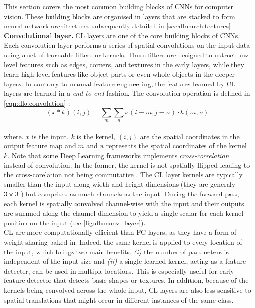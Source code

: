 This section covers the most common building blocks of \acp{CNN} for computer
vision. These building blocks are organised in layers that are stacked to form
neural network architectures subsequently detailed in
\cref{sec:dlo:architectures}.\\

\noindent\textbf{Convolutional layer.} \ac{CL} layers are one of the core
building blocks of \acp{CNN}. Each convolution layer performs a series of
spatial convolutions on the input data using a set of learnable filters or
kernels. These filters are designed to extract low-level features such as edges,
corners, and textures in the early layers, while they learn high-level features
like object parts or even whole objects in the deeper layers. In contrary to
manual feature engineering, the features learned by \ac{CL} layers are
learned in a \emph{end-to-end} fashion. The convolution operation is defined in
\cref{eqn:dlo:convolution} :\\

\begin{equation}
  \label{eqn:dlo:convolution}
  (x * k)(i,j) = \sum_{m} \sum_{n} x(i -m, j -n) \cdot k(m, n)
\end{equation}\\

\noindent where, $x$ is the input, $k$ is the kernel, $(i,j)$ are the spatial
coordinates in the output feature map and $m$ and $n$ represents the spatial
coordinates of the kernel $k$. Note that some Deep Learning frameworks
implements \emph{cross-correlation} instead of convolution. In the former, the
kernel is not spatially flipped leading to the cross-corelation not being
commutative \cite{goodfellow2016deep}. The \ac{CL} layer kernels are typically
smaller than the input along width and height dimensions (they are generaly
$3\times 3$ \cite{DBLP:conf/cvpr/HeZRS16}) but comprises as much channels as the
input. During the forward pass, each kernel is spatially convolved channel-wise
with the input and their outputs are summed along the channel dimension to yield
a single scalar for each kernel position on the input (see
\cref{fig:dlo:conv_layer}).\\

\ac{CL} are more computationally efficient than \ac{FC} layers, as they have a
form of weight sharing baked in. Indeed, the same kernel is applied to every
location of the input, which brings two main benefits: \emph{(i)} the number of
parameters is independent of the input size and \emph{(ii)} a single learned
kernel, acting as a feature detector, can be used in multiple locations. This is
especially useful for early feature detector that detects basic shapes or
textures. In addition, because of the kernels being convolved across the whole
input, \ac{CL} layers are also less sensitive to spatial translations that might
occur in different instances of the same class.

